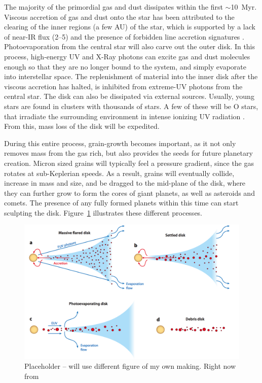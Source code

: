     The majority of the primordial gas and dust dissipates within the first $\sim$10~Myr. Viscous accretion of gas and dust onto the star has been attributed to the clearing of the inner regions (a few AU) of the star, which is supported by a lack of near-IR flux (2--5\micron) and the presence of forbidden line accretion signatures \citep[e.g., OI, SII][]{Hartigan1995}. Photoevaporation from the central star will also carve out the outer disk. In this process, high-energy UV and X-Ray photons can excite gas and dust molecules enough so that they are no longer bound to the system, and simply evaporate into interstellar space. The replenishment of material into the inner disk after the viscous accretion has halted, is inhibited from extreme-UV photons from the central star. The disk can also be dissipated via external sources. Usually, young stars are found in clusters with thousands of stars. A few of these will be O stars, that irradiate the surrounding environment in intense ionizing UV radiation \citep{Adams2004}. From this, mass loss of the disk will be expedited. 
    
    During this entire process, grain-growth becomes important, as it not only removes mass from the gas rich, but also provides the seeds for future planetary creation. Micron sized grains will typically feel a pressure gradient, since the gas rotates at sub-Keplerian speeds. As a result, grains will eventually collide, increase in mass and size, and be dragged to the mid-plane of the disk, where they can further grow to form the cores of giant planets, as well as asteroids and comets. The presence of any fully formed planets within this time can start sculpting the disk. Figure~\ref{fig:ppd_2_dd} illustrates these different processes.
    
    \begin{figure}
    \centering
    \includegraphics[width=\textwidth]{Ch1/disk_evolution_wc2011} 
    \caption[Disk Evolution Mechanisms]{Placeholder -- will use different figure of my own making. Right now from \citep{Williams2011}}
    \label{fig:ppd_2_dd}
    \end{figure}
    
